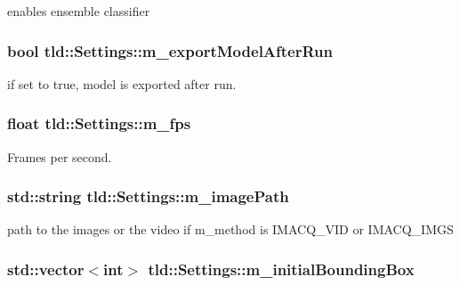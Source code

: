 enables ensemble classifier 

\hypertarget{classtld_1_1Settings_a5d0b425a526e5f7f78c758bfde3d9ee9}{
\subsubsection[{m\-\_\-export\-Model\-After\-Run}]{\setlength{\rightskip}{0pt plus 5cm}bool tld\-::\-Settings\-::m\-\_\-export\-Model\-After\-Run}}\label{classtld_1_1Settings_a5d0b425a526e5f7f78c758bfde3d9ee9}


if set to true, model is exported after run. 

\hypertarget{classtld_1_1Settings_aaa119898fb2f14ce2eed7fc861733eac}{
\subsubsection[{m\-\_\-fps}]{\setlength{\rightskip}{0pt plus 5cm}float tld\-::\-Settings\-::m\-\_\-fps}}\label{classtld_1_1Settings_aaa119898fb2f14ce2eed7fc861733eac}


Frames per second. 

\hypertarget{classtld_1_1Settings_abfd40dee05d0005e6cdaab2e0a84a4a9}{
\subsubsection[{m\-\_\-image\-Path}]{\setlength{\rightskip}{0pt plus 5cm}std\-::string tld\-::\-Settings\-::m\-\_\-image\-Path}}\label{classtld_1_1Settings_abfd40dee05d0005e6cdaab2e0a84a4a9}


path to the images or the video if m\-\_\-method is I\-M\-A\-C\-Q\-\_\-\-V\-I\-D or I\-M\-A\-C\-Q\-\_\-\-I\-M\-G\-S 

\hypertarget{classtld_1_1Settings_a42d73d86dc15625a1394e7491ebaf0e4}{
\subsubsection[{m\-\_\-initial\-Bounding\-Box}]{\setlength{\rightskip}{0pt plus 5cm}std\-::vector$<$int$>$ tld\-::\-Settings\-::m\-\_\-initial\-Bounding\-Box}}\label{classtld_1_1Settings_a42d73d86dc15625a1394e7491ebaf0e4}



